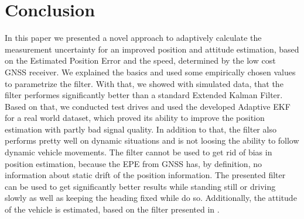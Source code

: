 \documentclass[conference]{IEEEtran}
\begin{document}
%





\section{Conclusion}
In this paper we presented a novel approach to adaptively calculate the measurement uncertainty for an improved position and attitude estimation, based on the Estimated Position Error and the speed, determined by the low cost GNSS receiver.
We explained the basics and used some empirically chosen values to parametrize the filter. With that, we showed with simulated data, that the filter performes significantly better than a standard Extended Kalman Filter. Based on that, we conducted test drives and used the developed Adaptive EKF for a real world dataset, which proved its ability to improve the position estimation with partly bad signal quality. In addition to that, the filter also performs pretty well on dynamic situations and is not loosing the ability to follow dynamic vehicle movements.
The filter cannot be used to get rid of bias in position estimation, because the EPE from GNSS has, by definition, no information about static drift of the position information.
The presented filter can be used to get significantly better results while standing still or driving slowly as well as keeping the heading fixed while do so.
Additionally, the attitude of the vehicle is estimated, based on the filter presented in \cite{Madgwick2010}.
\end{document}
